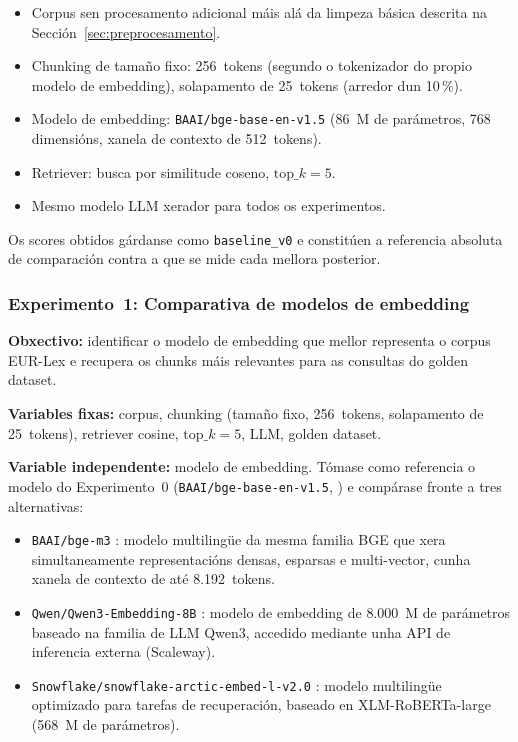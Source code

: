 \documentclass[11pt, a4paper, oneside]{report}
\begin{document}
\begin{itemize}
  \item Corpus sen procesamento adicional máis alá da limpeza básica descrita na
    Sección~\ref{sec:preprocesamento}.
  \item Chunking de tamaño fixo: 256~tokens (segundo o tokenizador do propio modelo
    de embedding), solapamento de 25~tokens (arredor dun 10\,\%).
  \item Modelo de embedding: \texttt{BAAI/bge-base-en-v1.5} \citep{xiao2023c}
    (86~M de parámetros, 768 dimensións, xanela de contexto de 512~tokens).
  \item Retriever: busca por similitude coseno, $\text{top}\_k = 5$.
  \item Mesmo modelo LLM xerador para todos os experimentos.
\end{itemize}

Os scores obtidos gárdanse como \texttt{baseline\_v0} e constitúen a referencia
absoluta de comparación contra a que se mide cada mellora posterior.

\subsubsection{Experimento~1: Comparativa de modelos de embedding}
\label{sec:exp1_embeddings}

\textbf{Obxectivo:} identificar o modelo de embedding que mellor representa o corpus
EUR-Lex e recupera os chunks máis relevantes para as consultas do golden dataset.

\textbf{Variables fixas:} corpus, chunking (tamaño fixo, 256~tokens, solapamento de
25~tokens), retriever cosine, $\text{top}\_k = 5$, LLM, golden dataset.

\textbf{Variable independente:} modelo de embedding. Tómase como referencia o modelo
do Experimento~0 (\texttt{BAAI/bge-base-en-v1.5}, \citealt{xiao2023c}) e compárase
fronte a tres alternativas:

\begin{itemize}
  \item \texttt{BAAI/bge-m3} \citep{chen2024m3embedding}: modelo multilingüe da
    mesma familia BGE que xera simultaneamente representacións densas, esparsas
    e multi-vector, cunha xanela de contexto de até 8.192~tokens.
  \item \texttt{Qwen/Qwen3-Embedding-8B} \citep{zhang2025qwen3embedding}: modelo de
    embedding de 8.000~M de parámetros baseado na familia de LLM Qwen3, accedido
    mediante unha API de inferencia externa (Scaleway).
  \item \texttt{Snowflake/snowflake-arctic-embed-l-v2.0} \citep{yu2024arcticembed}:
    modelo multilingüe optimizado para tarefas de recuperación, baseado en
    XLM-RoBERTa-large (568~M de parámetros).
\end{itemize}
\end{document}
